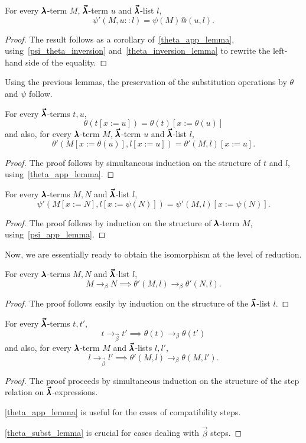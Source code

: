 \begin{corollary}
  \label{psi_app_lemma}
  For every $\pmb{\lambda}$-term $M$, $\pmb{\vec \lambda}$-term $u$ and $\pmb{\vec \lambda}$-list $l$,
  \[ \psi'(M, u :: l) = \psi(M)@(u, l). \]
\end{corollary}
\begin{proof}
  The result follows as a corollary of~\cref{theta_app_lemma}, using~\cref{psi_theta_inversion} and~\cref{theta_inversion_lemma} to rewrite the left-hand side of the equality.
\end{proof}

Using the previous lemmas, the preservation of the substitution operations by $\theta$ and $\psi$ follow.

\begin{lemma}
  \label{theta_subst_lemma}
  For every $\pmb{\vec \lambda}$-terms $t, u$,
  \[ \theta(t[x := u]) = \theta(t)[x := \theta(u)] \]
  and also, for every $\pmb{\lambda}$-term $M$,  $\pmb{\vec \lambda}$-term $u$ and $\pmb{\vec \lambda}$-list $l$,
  \[ \theta'(M[x := \theta(u)], l[x := u]) = \theta'(M, l)[x := u]. \]
\end{lemma}
\begin{proof}
  The proof follows by simultaneous induction on the structure of $t$ and $l$, using~\cref{theta_app_lemma}.
\end{proof}
  
\begin{lemma}
  \label{psi_subst_lemma}
  For every $\pmb{\lambda}$-terms $M, N$ and $\pmb{\vec \lambda}$-list $l$,
  \[ \psi'(M[x := N], l[x := \psi(N)]) = \psi'(M, l)[x := \psi(N)]. \]
\end{lemma}
\begin{proof}
  The proof follows by induction on the structure of $\pmb{\lambda}$-term $M$, using~\cref{psi_app_lemma}.
\end{proof}

Now, we are essentially ready to obtain the isomorphism at the level of reduction.

\begin{lemma}
  \label{theta_step_lemma}
  For every $\pmb{\lambda}$-terms $M, N$ and $\pmb{\vec \lambda}$-list $l$,
  \[ M \to_{\beta} N \implies \theta'(M, l) \to_{\beta} \theta'(N, l). \]
\end{lemma}
\begin{proof}
  The proof follows easily by induction on the structure of the $\pmb{\vec \lambda}$-list $l$.
\end{proof}

\begin{theorem}
  \label{theta_step_pres}
  For every $\pmb{\vec \lambda}$-terms $t, t'$,
  \[ t \to_{\vec \beta} t' \implies \theta(t) \to_{\beta} \theta(t') \]
  and also, for every $\pmb{\lambda}$-term $M$ and $\pmb{\vec \lambda}$-lists $l, l'$,
  \[ l \to_{\vec \beta} l' \implies \theta'(M, l) \to_{\beta} \theta(M, l'). \]
\end{theorem}
\begin{proof}
  The proof proceeds by simultaneous induction on the structure of the step relation on $\pmb{\vec \lambda}$-expressions.

  \cref{theta_app_lemma} is useful for the cases of compatibility steps.

  \cref{theta_subst_lemma} is crucial for cases dealing with $\vec \beta$ steps.
\end{proof}


